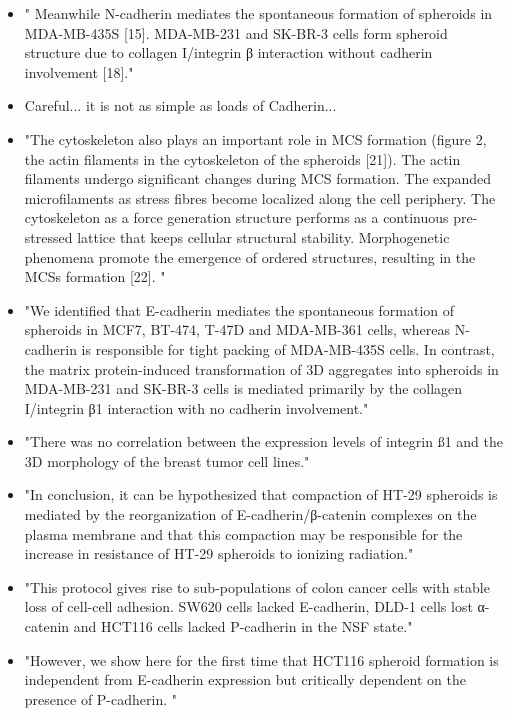 \documentclass[11pt,a4paper]{article}
\begin{document}
\begin{itemize}
\item " Meanwhile N-cadherin mediates the spontaneous formation of spheroids in MDA-MB-435S [15]. MDA-MB-231 and SK-BR-3 cells form spheroid structure due to collagen I/integrin β interaction without cadherin involvement [18]."\cite{Cui2017}

\item Careful... it is not as simple as loads of Cadherin...

\item "The cytoskeleton also plays an important role in MCS formation (figure 2, the actin filaments in the cytoskeleton of the spheroids [21]). The actin filaments undergo significant changes during MCS formation. The expanded microfilaments as stress fibres become localized along the cell periphery. The cytoskeleton as a force generation structure performs as a continuous pre-stressed lattice that keeps cellular structural stability. Morphogenetic phenomena promote the emergence of ordered structures, resulting in the MCSs formation [22]. "\cite{Cui2017}

\item "We identified that E-cadherin mediates the spontaneous formation of spheroids in MCF7, BT-474, T-47D and MDA-MB-361 cells, whereas N-cadherin is responsible for tight packing of MDA-MB-435S cells. In contrast, the matrix protein-induced transformation of 3D aggregates into spheroids in MDA-MB-231 and SK-BR-3 cells is mediated primarily by the collagen I/integrin β1 interaction with no cadherin involvement."\cite{Ivascu2008}

\item "There was no correlation between the expression levels of integrin ß1 and the 3D morphology of the breast tumor cell lines."\cite{Ivascu2008}

\item "In conclusion, it can be hypothesized that compaction of HT-29 spheroids is mediated by the reorganization of E-cadherin/β-catenin complexes on the plasma membrane and that this compaction may be responsible for the increase in resistance of HT-29 spheroids to ionizing radiation."\cite{Ferrante2006}

\item "This protocol gives rise to sub-populations of colon cancer cells with stable loss of cell-cell adhesion. SW620 cells lacked E-cadherin, DLD-1 cells lost α-catenin and HCT116 cells lacked P-cadherin in the NSF state."\cite{Stadler2018}

\item "However, we show here for the first time that HCT116 spheroid formation is independent from E-cadherin expression but critically dependent on the presence of P-cadherin. "\cite{Stadler2018}


\end{itemize}
\end{document}
